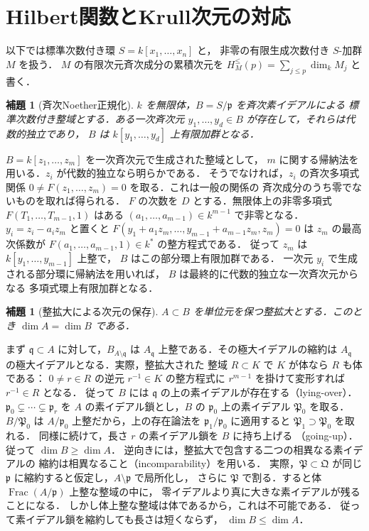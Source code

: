 \documentclass[a5paper,10pt,onecolumn]{jsarticle}
\makeatletter
\theoremstyle{mathnotetheorem}
\newtheorem{lemma}[theorem]{補題}
\renewcommand{\proofname}{証明}
\renewenvironment{proof}[1][\proofname]{%
  \par\pushQED{\qed}\normalfont\topsep4\p@\@plus2\p@\relax
  \trivlist\item[\hskip\labelsep\bfseries #1]\ignorespaces
}{\popQED\endtrivlist\@endpefalse}
\makeatother
\begin{document}
\section{Hilbert関数とKrull次元の対応}
以下では標準次数付き環 $S=k[x_1,\ldots,x_n]$ と，
非零の有限生成次数付き $S$-加群 $M$ を扱う．
$M$ の有限次元斉次成分の累積次元を
$H_M^{\le}(p)=\sum_{j\le p}\dim_kM_j$ と書く．
\begin{lemma}[斉次Noether正規化]
$k$ を無限体，$B=S/\mathfrak p$ を斉次素イデアルによる
標準次数付き整域とする．ある一次斉次元
$y_1,\ldots,y_d\in B$ が存在して，それらは代数的独立であり，
$B$ は $k[y_1,\ldots,y_d]$ 上有限加群となる．
\end{lemma}
\begin{proof}
$B=k[z_1,\ldots,z_m]$ を一次斉次元で生成された整域として，
$m$ に関する帰納法を用いる．$z_i$ が代数的独立なら明らかである．
そうでなければ，$z_i$ の斉次多項式関係
$0\ne F(z_1,\ldots,z_m)=0$ を取る．これは一般の関係の
斉次成分のうち零でないものを取れば得られる．
$F$ の次数を $D$ とする．無限体上の非零多項式
$F(T_1,\ldots,T_{m-1},1)$ はある
$(a_1,\ldots,a_{m-1})\in k^{m-1}$ で非零となる．
$y_i=z_i-a_i z_m$ と置くと
$F(y_1+a_1z_m,\ldots,y_{m-1}+a_{m-1}z_m,z_m)=0$
は $z_m$ の最高次係数が
$F(a_1,\ldots,a_{m-1},1)\in k^*$ の整方程式である．
従って $z_m$ は $k[y_1,\ldots,y_{m-1}]$ 上整で，
$B$ はこの部分環上有限加群である．
一次元 $y_i$ で生成される部分環に帰納法を用いれば，
$B$ は最終的に代数的独立な一次斉次元からなる
多項式環上有限加群となる．
\end{proof}
\begin{lemma}[整拡大による次元の保存]
$A\subset B$ を単位元を保つ整拡大とする．このとき
$\dim A=\dim B$ である．
\end{lemma}
\begin{proof}
まず $\mathfrak q\subset A$ に対して，$B_{A\setminus\mathfrak q}$ は
$A_{\mathfrak q}$ 上整である．その極大イデアルの縮約は
$A_{\mathfrak q}$ の極大イデアルとなる．実際，整拡大された
整域 $R\subset K$ で $K$ が体なら $R$ も体である：
$0\ne r\in R$ の逆元 $r^{-1}\in K$ の整方程式に
$r^{m-1}$ を掛けて変形すれば $r^{-1}\in R$ となる．
従って $B$ には $\mathfrak q$ の上の素イデアルが存在する（lying-over）．
$\mathfrak p_0\subsetneq\cdots\subsetneq\mathfrak p_r$ を
$A$ の素イデアル鎖とし，$B$ の $\mathfrak p_0$ 上の素イデアル
$\mathfrak P_0$ を取る．$B/\mathfrak P_0$ は
$A/\mathfrak p_0$ 上整だから，上の存在論法を
$\mathfrak p_1/\mathfrak p_0$ に適用すると
$\mathfrak P_1\supset\mathfrak P_0$ を取れる．
同様に続けて，長さ $r$ の素イデアル鎖を $B$ に持ち上げる
（going-up）．従って $\dim B\ge\dim A$．
逆向きには，整拡大で包含する二つの相異なる素イデアルの
縮約は相異なること（incomparability）を用いる．
実際，$\mathfrak P\subset\mathfrak Q$ が同じ
$\mathfrak p$ に縮約すると仮定し，$A\setminus\mathfrak p$ で局所化し，
さらに $\mathfrak P$ で割る．すると体
$\operatorname{Frac}(A/\mathfrak p)$ 上整な整域の中に，
零イデアルより真に大きな素イデアルが残ることになる．
しかし体上整な整域は体であるから，これは不可能である．
従って素イデアル鎖を縮約しても長さは短くならず，
$\dim B\le\dim A$．
\end{proof}
\end{document}
